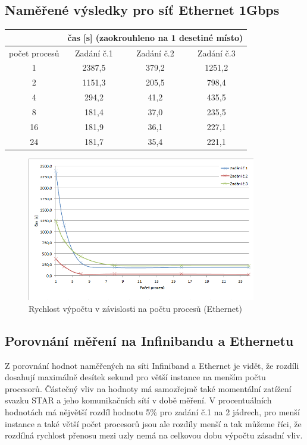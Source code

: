 \documentclass[12pt]{article}
\begin{document}
\subsection{Naměřené výsledky pro síť Ethernet 1Gbps}

\begin{center}
\begin{tabular}{|c|c|c|c|}
\hline 
 & \multicolumn{3}{c|}{čas [s] (zaokrouhleno na 1 desetiné místo)} \\ 
\hline 
počet procesů & Zadání č.1 & Zadání č.2 & Zadání č.3 \\ 
\hline 
\hline 
1 & 2387,5 & 379,2 & 1251,2 \\ 
\hline 
2 & 1151,3 & 205,5 & 798,4 \\ 
\hline 
4 & 294,2 & 41,2 & 435,5 \\ 
\hline 
8 & 181,4 & 37,0 & 235,5 \\ 
\hline 
16 & 181,9 & 36,1 & 227,1 \\ 
\hline 
24 & 181,7 & 35,4 & 221,1 \\ 
\hline 
\end{tabular} 
\end{center}

\begin{figure}[h]
\begin{center}
\includegraphics[width=100mm]{cpu_time_ethernet.png}
\caption{Rychlost výpočtu v závislosti na počtu procesů (Ethernet)}
\label{fig:ct_inifini}
\end{center}
\end{figure}


\subsection{Porovnání měření na Infinibandu a Ethernetu}
Z porovnání hodnot naměřených na síti Infiniband a Ethernet je vidět, že rozdíli dosahují maximálně desítek sekund pro větší instance na menším počtu procesorů. Částečný vliv na hodnoty má samozřejmě také momentální zatížení svazku STAR a jeho komunikačních sítí v době měření. V procentuálních hodnotách má nějvětší rozdíl hodnotu 5\% pro zadání č.1 na 2 jádrech, pro menší instance a také větší počet procesorů jsou ale rozdíly menší a tak můžeme říci, že rozdílná rychlost přenosu mezi uzly nemá na celkovou dobu výpočtu zásadní vliv.
\end{document}
